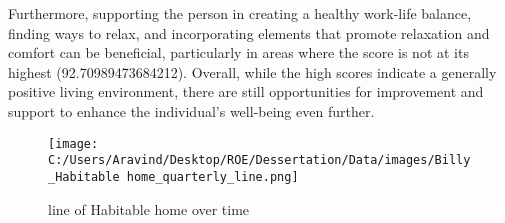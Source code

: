 \documentclass[10pt, a4paper]{article}%
\begin{document}
\newline%
Furthermore, supporting the person in creating a healthy work{-}life balance, finding ways to relax, and incorporating elements that promote relaxation and comfort can be beneficial, particularly in areas where the score is not at its highest (92.70989473684212).\newline%
\newline%
Overall, while the high scores indicate a generally positive living environment, there are still opportunities for improvement and support to enhance the individual's well{-}being even further.%
\begin{figure}[H]%
\centering%
\texttt{[image: C:/Users/Aravind/Desktop/ROE/Dessertation/Data/images/Billy\_Habitable home\_quarterly\_line.png]}%
\caption{line of Habitable home over time}%
\end{figure}

%
\end{document}
